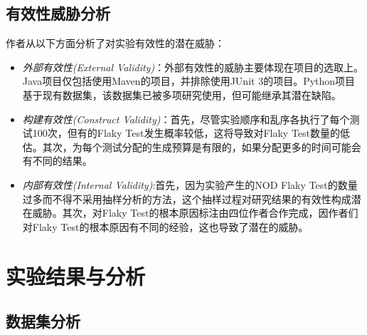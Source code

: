 \documentclass{article}
\newcommand{\flakyTest}{Flaky Test}
\begin{document}
\subsection{有效性威胁分析}

作者从以下方面分析了对实验有效性的潜在威胁：

\begin{itemize}
    \item \textit{外部有效性(External Validity)}：外部有效性的威胁主要体现在项目的选取上。Java项目仅包括使用Maven的项目，并排除使用JUnit
    3的项目。Python项目基于现有数据集，该数据集已被多项研究使用，但可能继承其潜在缺陷。
    \item \textit{构建有效性(Construct Validity)}：首先，尽管实验顺序和乱序各执行了每个测试100次，但有的\flakyTest 发生概率较低，这将导致对\flakyTest 数量的低估。其次，为每个测试分配的生成预算是有限的，如果分配更多的时间可能会有不同的结果。
    \item \textit{内部有效性(Internal Validity)}:首先，因为实验产生的NOD \flakyTest 的数量过多而不得不采用抽样分析的方法，这个抽样过程对研究结果的有效性构成潜在威胁。其次，对\flakyTest 的根本原因标注由四位作者合作完成，因作者们对\flakyTest 的根本原因有不同的经验，这也导致了潜在的威胁。

\end{itemize}

\section{实验结果与分析}

\subsection{数据集分析}
\end{document}
